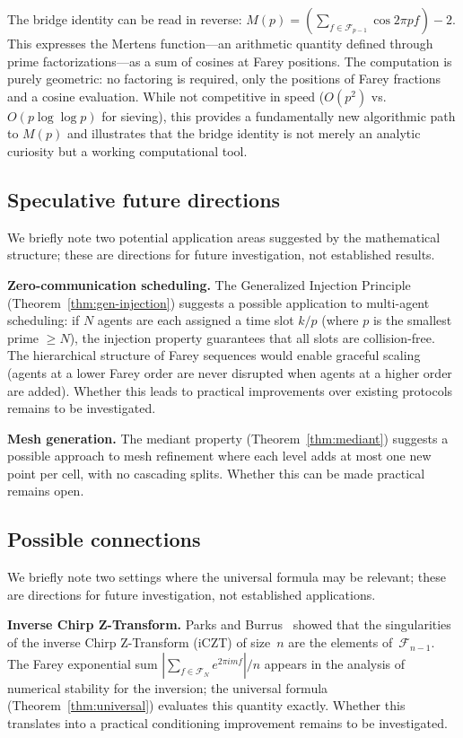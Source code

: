 \documentclass[11pt]{article}
\theoremstyle{definition}
\newcommand{\F}{\mathcal{F}}
\begin{document}
The bridge identity can be read in reverse: $M(p) =
(\sum_{f \in \F_{p-1}} \cos 2\pi pf) - 2$.  This expresses
the Mertens function---an arithmetic quantity defined through
prime factorizations---as a sum of cosines at Farey positions.
The computation is purely geometric: no factoring is required,
only the positions of Farey fractions and a cosine evaluation.
While not competitive in speed ($O(p^2)$ vs.\ $O(p\log\log p)$
for sieving), this provides a fundamentally new algorithmic path
to $M(p)$ and illustrates that the bridge identity is not
merely an analytic curiosity but a working computational tool.

\subsection{Speculative future directions}

We briefly note two potential application areas suggested
by the mathematical structure; these are directions for
future investigation, not established results.

\textbf{Zero-communication scheduling.}\quad
The Generalized Injection Principle
(Theorem~\ref{thm:gen-injection}) suggests a possible application
to multi-agent scheduling: if $N$ agents are each assigned
a time slot $k/p$ (where $p$ is the smallest prime $\ge N$),
the injection property guarantees that all slots are
collision-free.  The hierarchical structure of Farey sequences
would enable graceful scaling (agents at a lower Farey order
are never disrupted when agents at a higher order are added).
Whether this leads to practical improvements over existing
protocols remains to be investigated.

\textbf{Mesh generation.}\quad
The mediant property (Theorem~\ref{thm:mediant}) suggests
a possible approach to mesh refinement where each level adds
at most one new point per cell, with no cascading splits.
Whether this can be made practical remains open.

\subsection{Possible connections}

We briefly note two settings where the universal formula may
be relevant; these are directions for future investigation,
not established applications.

\textbf{Inverse Chirp Z-Transform.}\quad
Parks and Burrus~\cite{ParksBurrus2020} showed that the
singularities of the inverse Chirp Z-Transform (iCZT) of
size~$n$ are the elements of~$\F_{n-1}$.  The Farey exponential
sum $|\sum_{f \in \F_N} e^{2\pi imf}|/n$ appears in the
analysis of numerical stability for the inversion; the universal
formula (Theorem~\ref{thm:universal}) evaluates this quantity
exactly.  Whether this translates into a practical conditioning
improvement remains to be investigated.
\end{document}
